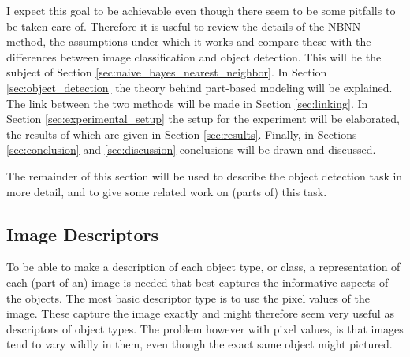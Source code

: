 \documentclass[a4paper,10pt]{article}
\begin{document}
I expect this goal to be achievable even though there seem to be some pitfalls to be taken care of. Therefore it is useful to review the details of the NBNN method, the assumptions under which it works and compare these with the differences between image classification and object detection. This will be the subject of Section \ref{sec:naive_bayes_nearest_neighbor}. In Section \ref{sec:object_detection} the theory behind part-based modeling will be explained. The link between the two methods will be made in Section \ref{sec:linking}. In Section \ref{sec:experimental_setup} the setup for the experiment will be elaborated, the results of which are given in Section \ref{sec:results}. Finally, in Sections \ref{sec:conclusion} and \ref{sec:discussion} conclusions will be drawn and discussed.

The remainder of this section will be used to describe the object detection task in more detail, and to give some related work on (parts of) this task. 
\subsection{Image Descriptors} %
\label{sub:image_descriptors}
To be able to make a description of each object type, or class, a representation of each (part of an) image is needed that best captures the informative aspects of the objects. The most basic descriptor type is to use the pixel values of the image. These capture the image exactly and might therefore seem very useful as descriptors of object types. The problem however with pixel values, is that images tend to vary wildly in them, even though the exact same object might pictured.
\end{document}
